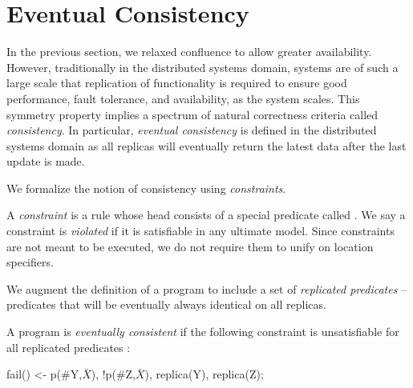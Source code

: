\section{Eventual Consistency}

In the previous section, we relaxed confluence to allow greater availability.  However, traditionally in the distributed systems domain, systems are of such a large scale that replication of functionality is required to ensure good performance, fault tolerance, and availability, as the system scales.  This symmetry property implies a spectrum of natural correctness criteria called {\em consistency}.  In particular, {\em eventual consistency} is defined in the distributed systems domain as all replicas will eventually return the latest data after the last update is made.

We formalize the notion of consistency using {\em constraints}.

\begin{definition}
A {\em constraint} is a rule whose head consists of a special predicate called .  We say a constraint is {\em violated} if it is satisfiable in any ultimate model.  Since constraints are not meant to be executed, we do not require them to unify on location specifiers.
\end{definition}

We augment the definition of a \lang program to include a set of {\em replicated predicates} -- predicates that will be eventually always identical on all replicas.

\begin{definition}
\label{def:ec}
A \lang program is {\em eventually consistent} if the following constraint is unsatisfiable for all replicated predicates :

\begin{Dedalus}
fail() <- p(#Y,\(\bar{X}\)), !p(#Z,\(\bar{X}\)), replica(Y), replica(Z);
\end{Dedalus}
\end{definition}


